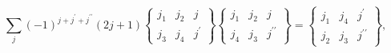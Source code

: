\[\sum_{j}(-1)^{j+j^{\prime}+j^{\prime\prime}}(2j+1)\begin{Bmatrix}j_{1}&j_{2}&j%
\\
j_{3}&j_{4}&j^{\prime}\end{Bmatrix}\begin{Bmatrix}j_{1}&j_{2}&j\\
j_{4}&j_{3}&j^{\prime\prime}\end{Bmatrix}=\begin{Bmatrix}j_{1}&j_{4}&j^{\prime%
}\\
j_{2}&j_{3}&j^{\prime\prime}\end{Bmatrix},\]